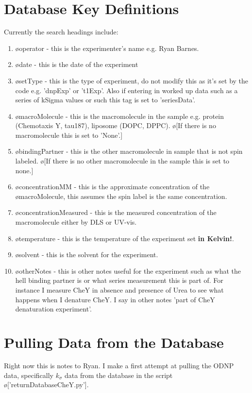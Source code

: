 \documentclass[10pt]{book}
\begin{document}
\section{Database Key Definitions}
Currently the search headings include:
\begin{enumerate}
    \item \o{operator} - this is the experimenter's name e.g. Ryan Barnes.
    \item \o{date} - this is the date of the experiment
    \item \o{setType} - this is the type of experiment, do not modify this as it's set by the code e.g. 'dnpExp' or 't1Exp'. Also if entering in worked up data such as a series of kSigma values or such this tag is set to 'seriesData'.
    \item \o{macroMolecule} - this is the macromolecule in the sample e.g. protein (Chemotaxis Y, tau187), liposome (DOPC, DPPC). \o[If there is no macromolecule this is set to 'None'.]{} 
    \item \o{bindingPartner} - this is the other macromolecule in sample that is not spin labeled. \o[If there is no other macromolecule in the sample this is set to none.]{} 
    \item \o{concentrationMM} - this is the approximate concentration of the \o{macroMolecule}, this assumes the spin label is the same concentration.
    \item \o{concentrationMeasured} - this is the measured concentration of the macromolecule either by DLS or UV-vis.
    \item \o{temperature} - this is the temperature of the experiment set {\bf in Kelvin!}.
    \item \o{solvent} - this is the solvent for the experiment.
    \item \o{otherNotes} - this is other notes useful for the experiment such as what the hell binding partner is or what series measurement this is part of. For instance I measure CheY in absence and presence of Urea to see what happens when I denature CheY. I say in other notes 'part of CheY denaturation experiment'.
\end{enumerate}
\section{Pulling Data from the Database}

Right now this is notes to Ryan. 
I make a first attempt at pulling the ODNP data, specifically $k_{\sigma}$ data from the database in the script \o['returnDatabaseCheY.py']{}.
\end{document}

